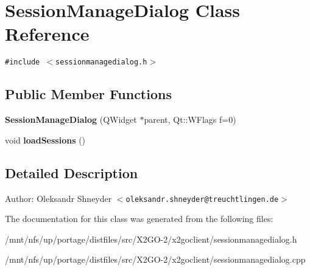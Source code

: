\section{Session\-Manage\-Dialog Class Reference}
\label{classSessionManageDialog}
{\tt \#include $<$sessionmanagedialog.h$>$}

\subsection*{Public Member Functions}
\begin{CompactItemize}
\item 
\textbf{Session\-Manage\-Dialog} (QWidget $\ast$parent, Qt::WFlags f=0)\label{classSessionManageDialog_022e15f3d83c03c3f4611ae8294cfb04}

\item 
void \textbf{load\-Sessions} ()\label{classSessionManageDialog_0d632645bf27891af7b177483f831328}

\end{CompactItemize}


\subsection{Detailed Description}
\begin{Desc}
\item[Author:]Oleksandr Shneyder $<$\tt{oleksandr.shneyder@treuchtlingen.de}$>$ \end{Desc}




The documentation for this class was generated from the following files:\begin{CompactItemize}
\item 
/mnt/nfs/up/portage/distfiles/src/X2GO-2/x2goclient/sessionmanagedialog.h\item 
/mnt/nfs/up/portage/distfiles/src/X2GO-2/x2goclient/sessionmanagedialog.cpp\end{CompactItemize}
